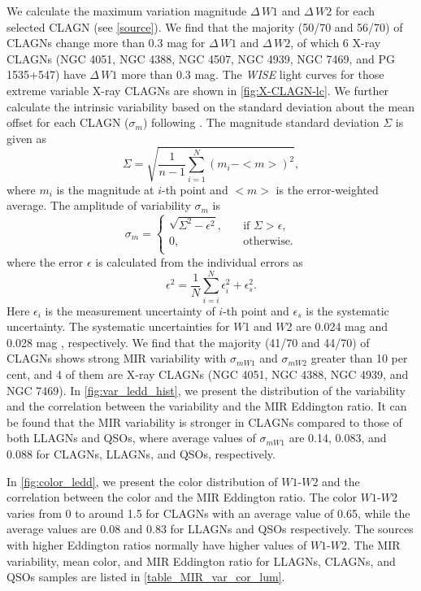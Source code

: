 \documentclass[linenumbers]{aastex631}
\begin{document}
We calculate the maximum variation magnitude $\Delta\,W1$ and $\Delta\,W2$ for each selected CLAGN (see \autoref{source}). We find that the majority (50/70 and 56/70) of CLAGNs change more than $0.3$ mag for $\Delta\,W1$ and $\Delta\,W2$, of which 6 X-ray CLAGNs (NGC 4051, NGC 4388, NGC 4507, NGC 4939, NGC 7469, and PG 1535+547) have $\Delta\,W1$ more than $0.3$ mag. The {\it WISE} light curves for those extreme variable X-ray CLAGNs are shown in \autoref{fig:X-CLAGN-lc}. We further calculate the intrinsic variability based on the standard deviation about the mean offset for each CLAGN ($\sigma_m$) following \citet{2019MNRAS.483.2362R} \citep[see also][etc]{2007AJ....134.2236S,2012ApJ...759L..31J}.
The magnitude standard deviation $\Sigma$ is given as
\begin{equation}
\Sigma=\sqrt{\frac{1}{n-1}\sum_{i=1}^{N}(m_i - <m>)^2},
\end{equation}
where $m_i$ is the magnitude at $i$-th point and $<m>$ is the error-weighted average.
The amplitude of variability $\sigma_m$ is  
\[\sigma_m  =
  \begin{cases}
    \sqrt{\Sigma^2 - \epsilon^2},  & \quad \text{if } \Sigma>\epsilon,\\
     0,                            & \quad  \text{otherwise.}\\
  \end{cases}
\]	               
where the error $\epsilon$ is calculated from the individual errors as
\begin{equation}
\epsilon^2=\frac{1}{N}\sum_{i=i}^{N}{\epsilon_{i}^{2} + \epsilon_{s}^2}. 
\end{equation}
Here $\epsilon_{i}$ is the measurement uncertainty of $i$-th point and $\epsilon_{s}$ is the systematic uncertainty. The systematic uncertainties for $W$1 and $W$2 are 0.024 mag and 0.028 mag \citep{2011ApJ...735..112J}, respectively. We find that the majority (41/70 and 44/70) of CLAGNs shows strong MIR variability with $\sigma_{m W1}$ and $\sigma_{m W2}$ greater than 10 per cent, and 4 of them are X-ray CLAGNs (NGC 4051, NGC 4388, NGC 4939, and NGC 7469). In \autoref{fig:var_ledd_hist}, we present the distribution of the variability {\color{red}and the correlation between the variability and the MIR Eddington ratio}. It can be found that the MIR variability is stronger in CLAGNs compared to those of both LLAGNs and QSOs, where average values of $\sigma_{m W1}$ are 0.14, 0.083, and 0.088 for CLAGNs, LLAGNs, and QSOs, respectively.  


In \autoref{fig:color_ledd}, we present the color distribution of $W1$-$W2$ {\color{red} and the correlation between the color and the MIR Eddington ratio}. The color $W1$-$W2$ varies from 0 to around 1.5 for CLAGNs with an average value of 0.65, while the average values are 0.08 and 0.83 for LLAGNs and QSOs respectively. The sources with higher Eddington ratios normally have higher values of $W1$-$W2$. {\color{red}The MIR variability, mean color, and MIR Eddington ratio for LLAGNs, CLAGNs, and QSOs samples are listed in \autoref{table_MIR_var_cor_lum}.}
\end{document}
